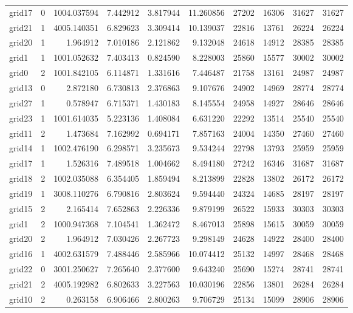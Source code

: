 \begin{longtable}{|l|r|r|r|r|r|r|r|r|r|}
grid17 & 0 & 1004.037594 & 7.442912 & 3.817944 & 11.260856 & 27202 & 16306 & 31627 & 31627 \\
grid21 & 1 & 4005.140351 & 6.829623 & 3.309414 & 10.139037 & 22816 & 13761 & 26224 & 26224 \\
grid20 & 1 & 1.964912 & 7.010186 & 2.121862 & 9.132048 & 24618 & 14912 & 28385 & 28385 \\
grid1 & 1 & 1001.052632 & 7.403413 & 0.824590 & 8.228003 & 25860 & 15577 & 30002 & 30002 \\
grid0 & 2 & 1001.842105 & 6.114871 & 1.331616 & 7.446487 & 21758 & 13161 & 24987 & 24987 \\
grid13 & 0 & 2.872180 & 6.730813 & 2.376863 & 9.107676 & 24902 & 14969 & 28774 & 28774 \\
grid27 & 1 & 0.578947 & 6.715371 & 1.430183 & 8.145554 & 24958 & 14927 & 28646 & 28646 \\
grid23 & 1 & 1001.614035 & 5.223136 & 1.408084 & 6.631220 & 22292 & 13514 & 25540 & 25540 \\
grid11 & 2 & 1.473684 & 7.162992 & 0.694171 & 7.857163 & 24004 & 14350 & 27460 & 27460 \\
grid14 & 1 & 1002.476190 & 6.298571 & 3.235673 & 9.534244 & 22798 & 13793 & 25959 & 25959 \\
grid17 & 1 & 1.526316 & 7.489518 & 1.004662 & 8.494180 & 27242 & 16346 & 31687 & 31687 \\
grid18 & 2 & 1002.035088 & 6.354405 & 1.859494 & 8.213899 & 22828 & 13802 & 26172 & 26172 \\
grid19 & 1 & 3008.110276 & 6.790816 & 2.803624 & 9.594440 & 24324 & 14685 & 28197 & 28197 \\
grid15 & 2 & 2.165414 & 7.652863 & 2.226336 & 9.879199 & 26522 & 15933 & 30303 & 30303 \\
grid1 & 2 & 1000.947368 & 7.104541 & 1.362472 & 8.467013 & 25898 & 15615 & 30059 & 30059 \\
grid20 & 2 & 1.964912 & 7.030426 & 2.267723 & 9.298149 & 24628 & 14922 & 28400 & 28400 \\
grid16 & 1 & 4002.631579 & 7.488446 & 2.585966 & 10.074412 & 25132 & 14997 & 28468 & 28468 \\
grid22 & 0 & 3001.250627 & 7.265640 & 2.377600 & 9.643240 & 25690 & 15274 & 28741 & 28741 \\
grid21 & 2 & 4005.192982 & 6.802633 & 3.227563 & 10.030196 & 22856 & 13801 & 26284 & 26284 \\
grid10 & 2 & 0.263158 & 6.906466 & 2.800263 & 9.706729 & 25134 & 15099 & 28906 & 28906 \\

\end{longtable}
